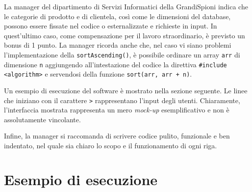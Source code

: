 \documentclass[a4paper, 11pt]{exam}
\begin{document}
La manager del dipartimento di Servizi Informatici della GrandiSpioni indica che le categorie di prodotto e di clientela, così come le dimensioni del database, possono essere fissate nel codice o esternalizzate e richieste in input. 
In quest'ultimo caso, come compensazione per il lavoro straordinario, è previsto un bonus di 1 punto.
La manager ricorda anche che, nel caso vi siano problemi l'implementazione della \texttt{sortAscending()}, è possibile ordinare un array \texttt{arr} di dimensione \texttt{n} aggiungendo all'intestazione del codice la direttiva \texttt{\#include <algorithm>} e servendosi della funzione \texttt{sort(arr, arr + n)}.

Un esempio di esecuzione del software è mostrato nella sezione seguente. 
Le linee che iniziano con il carattere \texttt{>} rappresentano l'input degli utenti.
Chiaramente, l'interfaccia mostrata rappresenta un mero \textit{mock-up} esemplificativo e non è assolutamente vincolante. 

Infine, la manager si raccomanda di scrivere codice pulito, funzionale e ben indentato, nel quale sia chiaro lo scopo e il funzionamento di ogni riga.
\section*{Esempio di esecuzione}
\end{document}
